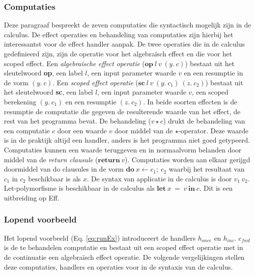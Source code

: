 \subsubsection{Computaties}
Deze paragraaf bespreekt de zeven computaties die syntactisch mogelijk zijn in de calculus. De effect operaties en behandeling van computaties zijn hierbij het interessantst voor de effect handler aanpak. \newline
De twee operaties die in de calculus gedefinieerd zijn, zijn de operatie voor het algebraïsch effect en die voor het scoped effect. Een \emph{algebraïsche effect operatie} ($\textbf{op}\:l\:v\:(y.\:c)$) bestaat uit het sleutelwoord \textbf{op}, een label $l$, een input parameter waarde $v$ en een resumptie in de vorm $(y.\:c)$. Een \emph{scoped effect operatie} ($\textbf{sc}\:l\:v\:(y.\:c_{1})\:(z.\:c_{2})$) bestaat uit het sleutelwoord \textbf{sc}, een label $l$, een input parameter waarde $v$, een scoped berekening $(y.\:c_{1})$ en een resumptie $(z.\:c_{2})$. In beide soorten effecten is de resumptie de computatie die gegeven de resulterende waarde van het effect, de rest van het programma bevat. \newline  
De behandeling ($v \star c$) drukt de behandeling van een computatie $c$ door een waarde $v$ door middel van de $\star$-operator. Deze waarde is in de praktijk altijd een handler, anders is het programma niet goed getypeerd. \newline 
Computaties kunnen een waarde teruggeven en in normaalvorm belanden door middel van de \emph{return clausule} ($\textbf{return}\:v$). \newline  
Computaties worden aan elkaar gerijgd doormiddel van do clausules in de vorm $\textbf{do}\:x \leftarrow c_{1};\:c_{2}$ waarbij het resultaat van $c_{1}$ in $c_{2}$ beschikbaar is als $x$. \newline 
De syntax van applicatie in de calculus is door $v_{1}\:v_{2}$. \newline
Let-polymorfisme is beschikbaar in de calculus als $\textbf{let}\ 
 x \  = \  v \  \textbf{in} \  c$. Dit is een uitbreiding op Eff.

\subsubsection{Lopend voorbeeld}
Het lopend voorbeeld (Eq. \ref{eq:runEx}) introduceert de handlers $h_{once}$ en $h_{inc}$. $c_{fwd}$ is de te behandelen computatie en bestaat uit een scoped effect operatie met in de continuatie een algebraïsch effect operatie. De volgende vergelijkingen stellen deze computaties, handlers en operaties voor in de syntaxis van de calculus.

